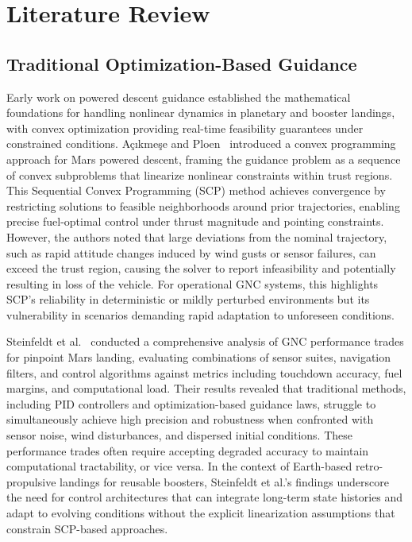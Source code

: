 \documentclass[10pt,twocolumn]{article}
\begin{document}
\section{Literature Review}

\subsection{Traditional Optimization-Based Guidance}

Early work on powered descent guidance established the mathematical foundations for handling nonlinear dynamics in planetary and booster landings, with convex optimization providing real-time feasibility guarantees under constrained conditions.
A\c{c}\i kme\c{s}e and Ploen~\cite{ackmese2007} introduced a convex programming approach for Mars powered descent, framing the guidance problem as a sequence of convex subproblems that linearize nonlinear constraints within trust regions.
This Sequential Convex Programming (SCP) method achieves convergence by restricting solutions to feasible neighborhoods around prior trajectories, enabling precise fuel-optimal control under thrust magnitude and pointing constraints.
However, the authors noted that large deviations from the nominal trajectory, such as rapid attitude changes induced by wind gusts or sensor failures, can exceed the trust region, causing the solver to report infeasibility and potentially resulting in loss of the vehicle.
For operational GNC systems, this highlights SCP's reliability in deterministic or mildly perturbed environments but its vulnerability in scenarios demanding rapid adaptation to unforeseen conditions.

Steinfeldt et al.~\cite{steinfeldt2010} conducted a comprehensive analysis of GNC performance trades for pinpoint Mars landing, evaluating combinations of sensor suites, navigation filters, and control algorithms against metrics including touchdown accuracy, fuel margins, and computational load.
Their results revealed that traditional methods, including PID controllers and optimization-based guidance laws, struggle to simultaneously achieve high precision and robustness when confronted with sensor noise, wind disturbances, and dispersed initial conditions.
These performance trades often require accepting degraded accuracy to maintain computational tractability, or vice versa.
In the context of Earth-based retro-propulsive landings for reusable boosters, Steinfeldt et al.'s findings underscore the need for control architectures that can integrate long-term state histories and adapt to evolving conditions without the explicit linearization assumptions that constrain SCP-based approaches.
\end{document}
